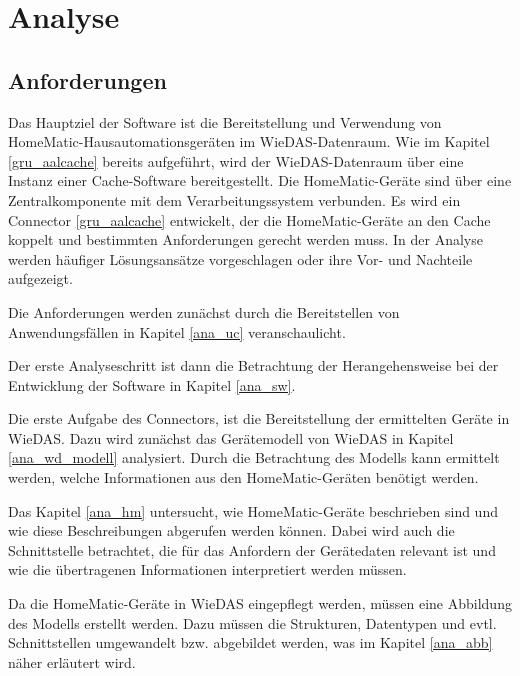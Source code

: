 
\chapter{Analyse}
\label{analyse}

\section{Anforderungen}
\label{ana_anforderungen}

Das Hauptziel der Software ist die Bereitstellung und Verwendung von HomeMatic-Hausautomationsgeräten
im WieDAS-Datenraum.
Wie im Kapitel \ref{gru_aalcache} bereits aufgeführt, wird der WieDAS-Datenraum über eine Instanz
einer Cache-Software bereitgestellt.
Die HomeMatic-Geräte sind über eine Zentralkomponente mit dem Verarbeitungssystem verbunden.
Es wird ein Connector \ref{gru_aalcache} entwickelt, der die HomeMatic-Geräte an den Cache koppelt
und bestimmten Anforderungen gerecht werden muss.
In der Analyse werden häufiger Lösungsansätze vorgeschlagen oder ihre Vor- und Nachteile aufgezeigt.

Die Anforderungen werden zunächst durch die Bereitstellen von Anwendungsfällen in Kapitel \ref{ana_uc}
veranschaulicht.

Der erste Analyseschritt ist dann die Betrachtung der Herangehensweise bei der Entwicklung der
Software in Kapitel \ref{ana_sw}.

Die erste Aufgabe des Connectors, ist die Bereitstellung der ermittelten Geräte in WieDAS.
Dazu wird zunächst das Gerätemodell von WieDAS in Kapitel \ref{ana_wd_modell} analysiert.
Durch die Betrachtung des Modells kann ermittelt werden, welche Informationen aus den HomeMatic-Geräten
benötigt werden.

Das Kapitel \ref{ana_hm} untersucht, wie HomeMatic-Geräte beschrieben sind und wie diese
Beschreibungen abgerufen werden können.
Dabei wird auch die Schnittstelle betrachtet, die für das Anfordern der Gerätedaten relevant ist und
wie die übertragenen Informationen interpretiert werden müssen.

Da die HomeMatic-Geräte in WieDAS eingepflegt werden, müssen eine Abbildung des Modells erstellt werden.
Dazu müssen die Strukturen, Datentypen und evtl. Schnittstellen umgewandelt bzw. abgebildet werden,
was im Kapitel \ref{ana_abb} näher erläutert wird.

